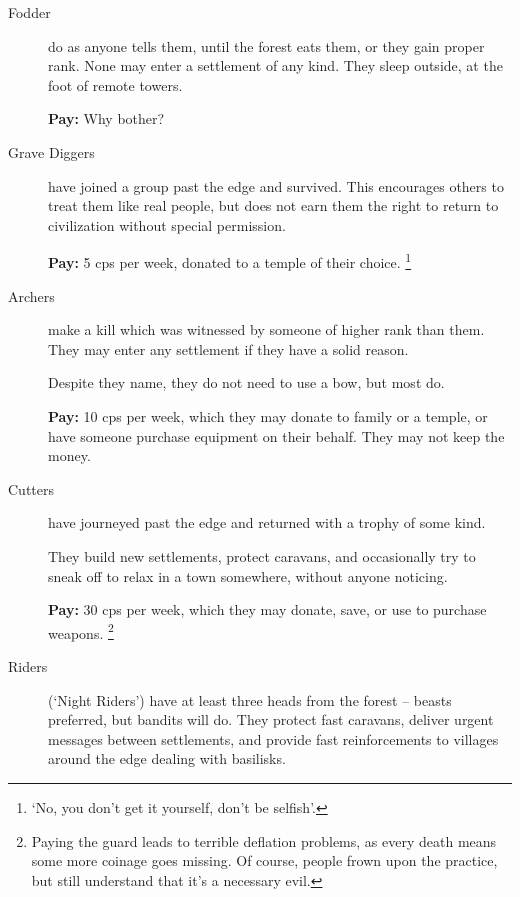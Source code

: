 \begin{multicols}{2}
\begin{description}
  \item[Fodder]
  \label{fodder}%
  do as anyone tells them, until the forest eats them, or they gain proper rank.
  None may enter a settlement of any kind.
  They sleep outside, at the foot of remote towers.

  \textbf{Pay:} Why bother?

  \item[Grave Diggers]
  have joined a group past the \gls{edge} and survived.
  This encourages others to treat them like real people, but does not earn them the right to return to civilization without special permission.

  \textbf{Pay:} 5 \glspl{cp} per week, donated to a temple of their choice.%
  \footnote{`No, you don't get it yourself, don't be selfish'.}

  \item[Archers]
  make a kill which was witnessed by someone of higher rank than them.
  They may enter any settlement if they have a solid reason.

  Despite they name, they do not need to use a bow, but most do.

  \textbf{Pay:} 10 \glspl{cp} per week, which they may donate to family or a temple, or have someone purchase equipment on their behalf.
  They may not keep the money.

  \item[Cutters]
  have journeyed past the \gls{edge} and returned with a trophy of some kind.

  They build new settlements, protect caravans, and occasionally try to sneak off to relax in a town somewhere, without anyone noticing.

  \textbf{Pay:} 30 \glspl{cp} per week, which they may donate, save, or use to purchase weapons.%
  \footnote{Paying the \gls{guard} leads to terrible deflation problems, as every death means some more coinage goes missing.
  Of course, people frown upon the practice, but still understand that it's a necessary evil.}

  \item[Riders]
  (`Night Riders')
  have at least three heads from the forest -- beasts preferred, but bandits will do.
  They protect fast caravans, deliver urgent messages between settlements, and provide fast reinforcements to \glspl{village} around the \gls{edge} dealing with basilisks.


\end{description}
\end{multicols}
